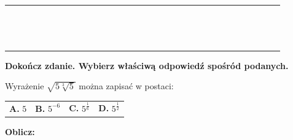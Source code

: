 \documentclass[12pt,a4paper]{article}
\theoremstyle{break}
\begin{document}
		\begin{tabular}{|p{0.1cm}|p{0.1cm}|p{0.1cm}|p{0.1cm}|p{0.1cm}|p{0.1cm}|p{0.1cm}|p{0.1cm}|p{0.1cm}|p{0.1cm}|p{0.1cm}|p{0.1cm}|p{0.1cm}|p{0.1cm}|p{0.1cm}|p{0.1cm}|p{0.1cm}|p{0.1cm}|p{0.1cm}|p{0.1cm}|p{0.1cm}|p{0.1cm}|p{0.1cm}|p{0.1cm}|p{0.1cm}|p{0.1cm}|p{0.1cm}|p{0.1cm}|p{0.1cm}|p{0.1cm}|p{0.1cm}|p{0.1cm}}
		\hline&&&&&&&&&&&&&&&&&&&&&&&&&&&&&&\\
		\hline&&&&&&&&&&&&&&&&&&&&&&&&&&&&&&\\
		\hline&&&&&&&&&&&&&&&&&&&&&&&&&&&&&&\\
		\hline&&&&&&&&&&&&&&&&&&&&&&&&&&&&&&\\
		\hline&&&&&&&&&&&&&&&&&&&&&&&&&&&&&&\\
		\hline&&&&&&&&&&&&&&&&&&&&&&&&&&&&&&\\
		\hline&&&&&&&&&&&&&&&&&&&&&&&&&&&&&&\\
		\hline&&&&&&&&&&&&&&&&&&&&&&&&&&&&&&\\
		\hline&&&&&&&&&&&&&&&&&&&&&&&&&&&&&&\\
		\hline&&&&&&&&&&&&&&&&&&&&&&&&&&&&&&\\
		\hline&&&&&&&&&&&&&&&&&&&&&&&&&&&&&&\\
		\hline&&&&&&&&&&&&&&&&&&&&&&&&&&&&&&\\
		\hline&&&&&&&&&&&&&&&&&&&&&&&&&&&&&&\\
		\hline&&&&&&&&&&&&&&&&&&&&&&&&&&&&&&\\
		\hline&&&&&&&&&&&&&&&&&&&&&&&&&&&&&&\\
		\hline
	\end{tabular}
	
	
	\begin{zad}[0-1]
		\textbf{Dokończ zdanie. Wybierz właściwą odpowiedź spośród podanych.}
	\end{zad} 
	
	Wyrażenie $\sqrt{5\sqrt[3]{5}}$ można zapisać w postaci:
	
	\vspace{0.5cm}
	\begin{tabular}{p{3.5cm} p{3.5cm} p{3.5cm} p{3.5cm}}
		\textbf{A. }$5$&
		\textbf{B. }$5^{-6}$&
		\textbf{C. }$5^\frac{1}{6}$&
		\textbf{D. }$5^\frac{1}{2}$\\
	\end{tabular}	

	
	\begin{zad}[0-1]
		\textbf{Oblicz:}
	\end{zad} 
	
\end{document}
